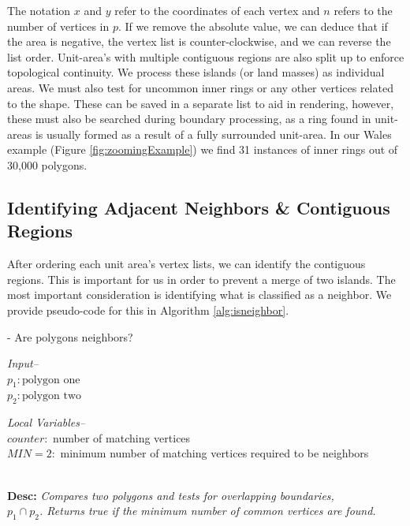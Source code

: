 The notation $x$ and $y$ refer to the coordinates of each vertex and $n$ refers to the number of vertices in $p$. If we remove the absolute value, we can deduce that if the area is negative, the vertex list is counter-clockwise, and we can reverse the list order. Unit-area's with multiple contiguous regions are also split up to enforce topological continuity. We process these islands (or land masses) as individual areas. We must also test for uncommon inner rings or any other vertices related to the shape. These can be saved in a separate list to aid in rendering, however, these must also be searched during boundary processing, as a ring found in unit-areas is usually formed as a result of a fully surrounded unit-area. In our Wales example (Figure \ref{fig:zoomingExample}) we find 31 instances of inner rings out of 30,000 polygons.

\subsection{Identifying Adjacent Neighbors \& Contiguous Regions} \label{neighbors}
After ordering each unit area's vertex lists, we can identify the contiguous regions. This is important for us in order to prevent a merge of two islands. The most important consideration is identifying what is classified as a neighbor. We provide pseudo-code for this in Algorithm \ref{alg:isneighbor}.

\begin{algorithm}[h]
\footnotesize
\caption{- Are polygons neighbors?}
\emph{Input--}\\
$p_{1}: \text{polygon one}$\\
$p_{2}: \text{polygon two}$\

\begin{algorithmic}[1]
\IfEnd
{}
\EndProcedure
\end{algorithmic}
\emph{Local Variables--}\\
$counter:$ number of matching vertices\\
$MIN = 2:$ minimum number of matching vertices required to be neighbors 
\begin{algorithmic}[1]
\IfEnd
\IfEnd
{}

\EndProcedure
\end{algorithmic} \label{alg:isneighbor}
~\\
\textbf{Desc: }\emph{Compares two polygons and tests for overlapping boundaries,\\ $p_1 \cap p_2$. Returns true if the minimum number of common vertices are found. }
\end{algorithm}



